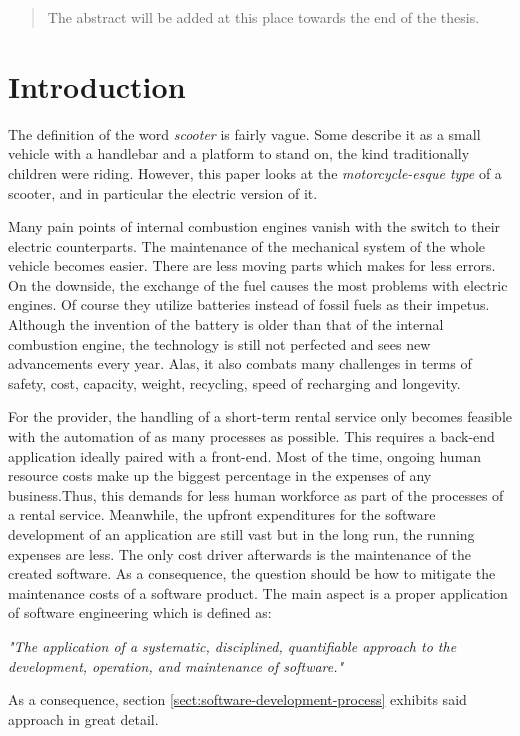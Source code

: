 \documentclass[12pt,a4paper]{report}
\begin{document}



\begin{abstract}

The abstract will be added at this place towards the end of the thesis.

\end{abstract}


\tableofcontents



\chapter{Introduction} \label{chap:intro}



The definition of the word \emph{scooter} is fairly vague.
Some describe it as a small vehicle with a handlebar and a platform to stand on,
the kind traditionally children were riding.
However, this paper looks at the \emph{motorcycle-esque type} of a scooter, and in
particular the electric version of it.

Many pain points of internal combustion engines vanish with the switch to their electric
counterparts. The maintenance of the mechanical system of the whole vehicle becomes easier.
There are less moving parts which makes for less errors.
On the downside, the exchange of the fuel causes the most problems with electric engines.
Of course they utilize batteries instead of fossil fuels as their impetus.
Although the invention of the battery is older than that of the
internal combustion engine\cn, the technology is still not perfected and sees new
advancements every year. Alas, it also combats many challenges in terms of
safety, cost, capacity, weight, recycling, speed of recharging and longevity.

For the provider, the handling of a short-term rental service
only becomes feasible with the automation of as many processes as possible.
This requires a back-end application ideally paired with a front-end.
Most of the time, ongoing human resource costs make up the biggest percentage
in the expenses of any business.\cn Thus, this demands for less human workforce
as part of the processes of a rental service.
Meanwhile, the upfront expenditures for the software development of
an application are still vast but in the long run, the running expenses are less.
The only cost driver afterwards is the maintenance of the created software.
As a consequence, the question should be how to mitigate the maintenance costs
of a software product. The main aspect is a proper application of
software engineering which is defined as:
\begin{displayquote}
\emph{"The application of a systematic, disciplined, quantifiable approach to the
development, operation, and maintenance of software."}~\cite{se-ieee}
\end{displayquote}
As a consequence, section \ref{sect:software-development-process} exhibits
said approach in great detail.
\end{document}
